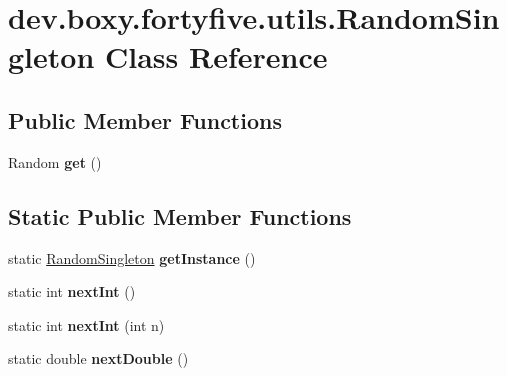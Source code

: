 \hypertarget{classdev_1_1boxy_1_1fortyfive_1_1utils_1_1_random_singleton}{
\section{dev.boxy.fortyfive.utils.RandomSingleton Class Reference}
\label{d1/d11/classdev_1_1boxy_1_1fortyfive_1_1utils_1_1_random_singleton}
}
\subsection*{Public Member Functions}
\begin{DoxyCompactItemize}
\item 
\hypertarget{classdev_1_1boxy_1_1fortyfive_1_1utils_1_1_random_singleton_a03170cf26bebf4ee3cc61ab405113798}{
Random {\bfseries get} ()}
\label{d1/d11/classdev_1_1boxy_1_1fortyfive_1_1utils_1_1_random_singleton_a03170cf26bebf4ee3cc61ab405113798}

\end{DoxyCompactItemize}
\subsection*{Static Public Member Functions}
\begin{DoxyCompactItemize}
\item 
\hypertarget{classdev_1_1boxy_1_1fortyfive_1_1utils_1_1_random_singleton_a083594c6c38937a1c4d22c31a179284a}{
static \hyperlink{classdev_1_1boxy_1_1fortyfive_1_1utils_1_1_random_singleton}{RandomSingleton} {\bfseries getInstance} ()}
\label{d1/d11/classdev_1_1boxy_1_1fortyfive_1_1utils_1_1_random_singleton_a083594c6c38937a1c4d22c31a179284a}

\item 
\hypertarget{classdev_1_1boxy_1_1fortyfive_1_1utils_1_1_random_singleton_aa7b424205b4ba0492b2da3545ff54b75}{
static int {\bfseries nextInt} ()}
\label{d1/d11/classdev_1_1boxy_1_1fortyfive_1_1utils_1_1_random_singleton_aa7b424205b4ba0492b2da3545ff54b75}

\item 
\hypertarget{classdev_1_1boxy_1_1fortyfive_1_1utils_1_1_random_singleton_a2b238657c2677698447e76e3b97c7d65}{
static int {\bfseries nextInt} (int n)}
\label{d1/d11/classdev_1_1boxy_1_1fortyfive_1_1utils_1_1_random_singleton_a2b238657c2677698447e76e3b97c7d65}

\item 
\hypertarget{classdev_1_1boxy_1_1fortyfive_1_1utils_1_1_random_singleton_a0afd0167994d75e84402f0435343b0ff}{
static double {\bfseries nextDouble} ()}
\label{d1/d11/classdev_1_1boxy_1_1fortyfive_1_1utils_1_1_random_singleton_a0afd0167994d75e84402f0435343b0ff}

\end{DoxyCompactItemize}
